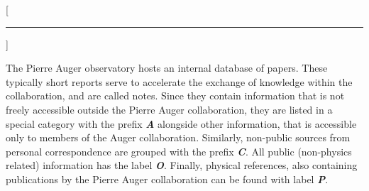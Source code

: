
[\hrule\vspace{-0.5cm}]
\printbibheading

The Pierre Auger observatory hosts an internal database of papers. These 
typically short reports serve to accelerate the exchange of knowledge within the
collaboration, and are called \GAP notes. Since they contain information that is
not freely accessible outside the Pierre Auger collaboration, they are listed in
a special category with the prefix \textbf{\textit{A}} alongside other 
information, that is accessible only to members of the Auger collaboration. 
Similarly, non-public sources from personal correspondence are grouped with the 
prefix \textbf{\textit{C}}. All public (non-physics related) information has the 
label \textbf{\textit{O}}. Finally, physical references, also containing 
publications by the Pierre Auger collaboration can be found with label 
\textbf{\textit{P}}.

\newrefcontext[labelprefix=A]
\printbibliography[keyword={auger},title={Auger internal},heading=subbibliography]

\newrefcontext[labelprefix=C]
\printbibliography[keyword={private},title={Personal Correspondence},heading=subbibliography]

\newrefcontext[labelprefix=O]
\printbibliography[notkeyword={private},notkeyword={phys},notkeyword={auger},title={Other References},heading=subbibliography]

\newrefcontext[labelprefix=P]
\printbibliography[keyword={phys},notkeyword={auger},title={Physics References},heading=subbibliography]

\cleardoublepage
